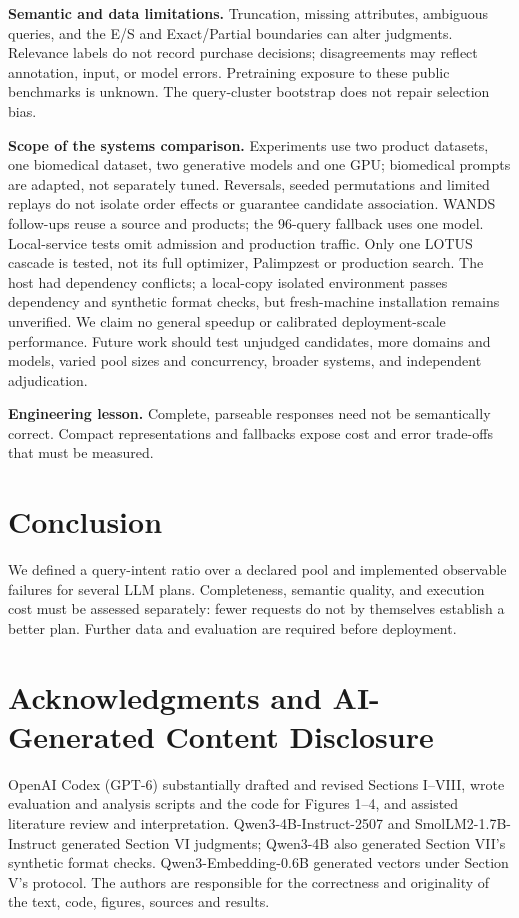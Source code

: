 \documentclass[conference]{IEEEtran}
\begin{document}
\textbf{Semantic and data limitations.} Truncation, missing attributes, ambiguous queries, and the E/S and Exact/Partial boundaries can alter judgments. Relevance labels do not record purchase decisions; disagreements may reflect annotation, input, or model errors. Pretraining exposure to these public benchmarks is unknown. The query-cluster bootstrap does not repair selection bias.

\textbf{Scope of the systems comparison.} Experiments use two product datasets, one biomedical dataset, two generative models and one GPU; biomedical prompts are adapted, not separately tuned. Reversals, seeded permutations and limited replays do not isolate order effects or guarantee candidate association. WANDS follow-ups reuse a source and products; the 96-query fallback uses one model. Local-service tests omit admission and production traffic. Only one LOTUS cascade is tested, not its full optimizer, Palimpzest or production search. The host had dependency conflicts; a local-copy isolated environment passes dependency and synthetic format checks, but fresh-machine installation remains unverified. We claim no general speedup or calibrated deployment-scale performance. Future work should test unjudged candidates, more domains and models, varied pool sizes and concurrency, broader systems, and independent adjudication.

\textbf{Engineering lesson.} Complete, parseable responses need not be semantically correct. Compact representations and fallbacks expose cost and error trade-offs that must be measured.

\section{Conclusion}
We defined a query-intent ratio over a declared pool and implemented observable failures for several LLM plans. Completeness, semantic quality, and execution cost must be assessed separately: fewer requests do not by themselves establish a better plan. Further data and evaluation are required before deployment.

\section*{Acknowledgments and AI-Generated Content Disclosure}
OpenAI Codex (GPT-6) substantially drafted and revised Sections I--VIII, wrote evaluation and analysis scripts and the code for Figures 1--4, and assisted literature review and interpretation. Qwen3-4B-Instruct-2507 and SmolLM2-1.7B-Instruct generated Section VI judgments; Qwen3-4B also generated Section VII's synthetic format checks. Qwen3-Embedding-0.6B generated vectors under Section V's protocol. The authors are responsible for the correctness and originality of the text, code, figures, sources and results.
\end{document}
